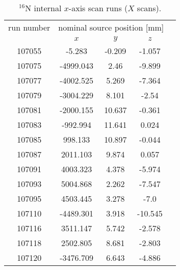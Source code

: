 \begin{table}[ht]
		\caption[$^{16}$N internal $x$-axis scan runs.]{$^{16}$N internal $x$-axis scan runs ($X$ scans).\label{table:n16scanTable_xscan}}
		\vspace{2mm}
				\centering
    	\begin{tabular*}{90mm}{c@{\extracolsep{\fill}}*4c}
    		\toprule 
    		run number  & \multicolumn{3}{c}{nominal source position [mm]}\\
    		\cline{2-4}
    		& $x$ & $y$ & $z$\\   
       \midrule
       107055 &-5.283 & -0.209 & -1.057\\
       107075 & -4999.043 & 2.46 & -9.899\\
       107077 & -4002.525 & 5.269 & -7.364\\
       107079 & -3004.229 & 8.101 & -2.54\\
       107081 & -2000.155 & 10.637 & -0.361 \\
       107083 & -992.994 & 11.641 & 0.024 \\
       107085 & 998.133 & 10.897 & -0.044\\
       107087 & 2011.103 & 9.874 & 0.057\\
       107091 & 4003.323 &  4.378 &  -5.974\\
       107093 & 5004.868 & 2.262 & -7.547\\
       107095 & 4503.445 & 3.278 & -7.0\\
       107110 & -4489.301 & 3.918 & -10.545\\
       107116 & 3511.147 & 5.742 & -2.578\\
       107118 & 2502.805 & 8.681 & -2.803\\
       107120 & -3476.709 & 6.643 & -4.886\\
		\bottomrule	
	\end{tabular*}
\end{table}

